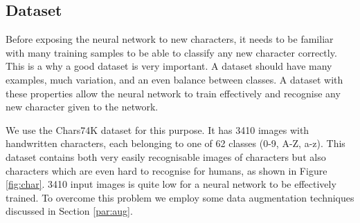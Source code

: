 \documentclass{article}
\begin{document}
\subsection{Dataset}
\label{sec:data}
Before exposing the neural network to new characters, it needs to be familiar with many training samples to be able to classify any new character correctly.
This is a why a good dataset is very important. A dataset should have many examples, much variation, and an even balance between classes. A dataset with these properties
allow the neural network to train effectively and recognise any new character given to the network.

We use the Chars74K dataset for this purpose. It has 3410 images with handwritten characters, each belonging to one of 62 classes (0-9, A-Z, a-z).
This dataset contains both very easily recognisable images of characters but also characters which are even hard to recognise for humans, as shown in Figure \ref{fig:char}.
3410 input images is quite low for a neural network to be effectively trained. To overcome this problem we employ some data augmentation techniques discussed in Section \ref{par:aug}.
\end{document}

